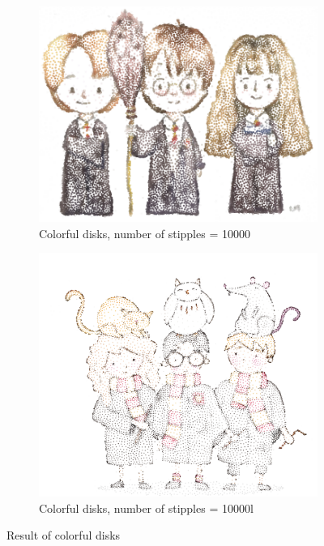 \documentclass[11pt]{article}
\begin{document}
\begin{figure}[h!]
\begin{subfigure}[b]{0.4\linewidth}
		\includegraphics[width=\linewidth]{harry1_color.png}
		\caption{Colorful disks, number of stipples = 10000}
	\end{subfigure}
	\begin{subfigure}[b]{0.4\linewidth}
		\includegraphics[width=\linewidth]{harry2_color.png}
		\caption{Colorful disks, number of stipples = 10000l}
	\end{subfigure}
	\caption{Result of colorful disks}
	\label{fig:3}
\end{figure}
\end{document}
